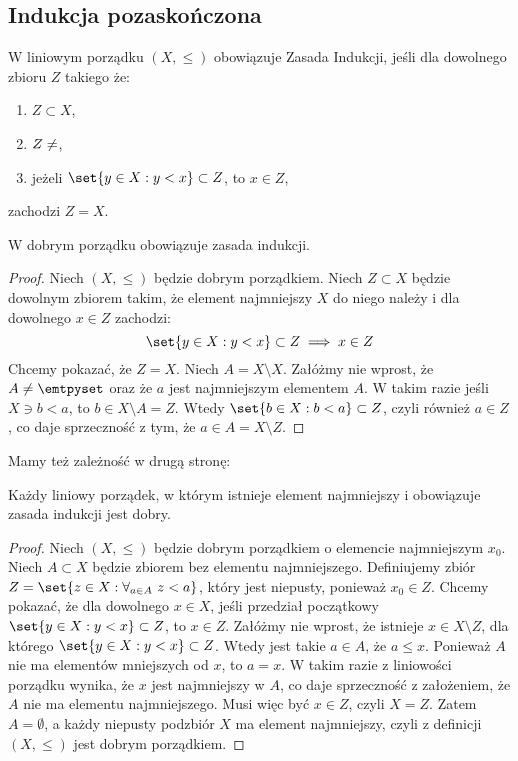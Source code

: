 \subsection{Indukcja pozaskończona}
\begin{definition}
    W liniowym porządku \( (X, \leq) \) obowiązuje Zasada Indukcji, jeśli dla dowolnego zbioru \( Z \) takiego że:
    \begin{enumerate}
        \item \( Z \subset X \),
        \item \( Z \neq \empty \),
        \item jeżeli \( \set{y \in X : y < x} \subset Z \), to \( x \in Z \),
    \end{enumerate}
    zachodzi \( Z = X \).
\end{definition}

\begin{theorem}
    W dobrym porządku obowiązuje zasada indukcji.
\end{theorem}
\begin{proof}
    Niech \( (X, \leq) \) będzie dobrym porządkiem. Niech \( Z \subset X \) będzie dowolnym zbiorem takim, że element najmniejszy \( X \) do niego należy
    i dla dowolnego \( x \in Z \) zachodzi:
    \[
        \set{y \in X : y < x} \subset Z \implies x \in Z
    \]
    Chcemy pokazać, że \( Z = X \). Niech \( A = X \setminus X \). Załóżmy nie wprost, że \( A \neq \emtpyset \) oraz że \( a \) jest najmniejszym elementem \( A \).
    W takim razie jeśli \( X \ni b < a \), to \( b \in X \setminus A = Z \). Wtedy \( \set{b \in X : b < a} \subset Z \), czyli również \( a \in Z \), co daje sprzeczność z tym, że \( a \in A = X \setminus Z \).
\end{proof}

Mamy też zależność w drugą stronę:
\begin{theorem}
    Każdy liniowy porządek, w którym istnieje element najmniejszy i obowiązuje zasada indukcji jest dobry.
\end{theorem}
\begin{proof}
    Niech \( (X, \leq) \) będzie dobrym porządkiem o elemencie najmniejszym \( x_0 \). Niech \( A \subset X \) będzie zbiorem bez elementu najmniejszego.
    Definiujemy zbiór \( Z = \set{z \in X : \forall_{a \in A} \ z < a} \), który jest niepusty, ponieważ \( x_0 \in Z \).
    Chcemy pokazać, że dla dowolnego \( x \in X \), jeśli przedział początkowy \( \set{y \in X : y < x} \subset Z \), to \( x \in Z \).
    Załóżmy nie wprost, że istnieje \( x \in X \setminus Z \), dla którego \( \set{y \in X : y < x} \subset Z \). Wtedy jest takie \( a \in A \),
    że \( a \leq x \). Ponieważ \( A \) nie ma elementów mniejszych od \( x \), to \( a = x \). W takim razie z liniowości porządku wynika, że \( x \) jest najmniejszy w \( A \),
    co daje sprzeczność z założeniem, że \( A \) nie ma elementu najmniejszego. Musi więc być \( x \in Z \), czyli \( X = Z \).
    Zatem \( A = \emptyset \), a każdy niepusty podzbiór \( X \) ma element najmniejszy, czyli z definicji \( (X, \leq) \) jest dobrym porządkiem.
\end{proof}

